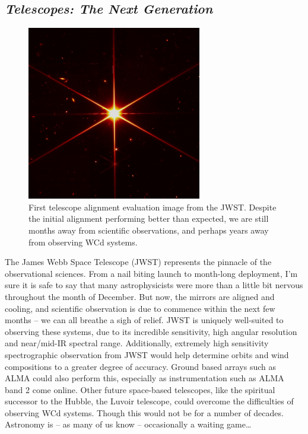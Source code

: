 \subsection{\emph{Telescopes: The Next Generation}}

\begin{figure}
  \centering
  \includegraphics[width=3in]{assets/jwst.jpg}
  \caption[First telescope alignment evaluation image from the JWST]{First telescope alignment evaluation image from the JWST. Despite the initial alignment performing better than expected, we are still months away from scientific observations, and perhaps years away from observing WCd systems.}
  \label{fig:jwst}
\end{figure}

The James Webb Space Telescope (JWST) represents the pinnacle of the observational sciences.
From a nail biting launch to month-long deployment, I'm sure it is safe to say that many astrophysicists were more than a little bit nervous throughout the month of December.
But now, the mirrors are aligned and cooling, and scientific observation is due to commence within the next few months -- we can all breathe a sigh of relief.
JWST is uniquely well-suited to observing these systems, due to its incredible sensitivity, high angular resolution and near/mid-IR spectral range.
Additionally, extremely high sensitivity spectrographic observation from JWST would help determine orbits and wind compositions to a greater degree of accuracy.
Ground based arrays such as ALMA could also perform this, especially as instrumentation such as ALMA band 2 come online.
Other future space-based telescopes, like the spiritual successor to the Hubble, the Luvoir telescope, could overcome the difficulties of observing WCd systems.
Though this would not be for a number of decades.
Astronomy is -- as many of us know -- occasionally a waiting game\ldots


